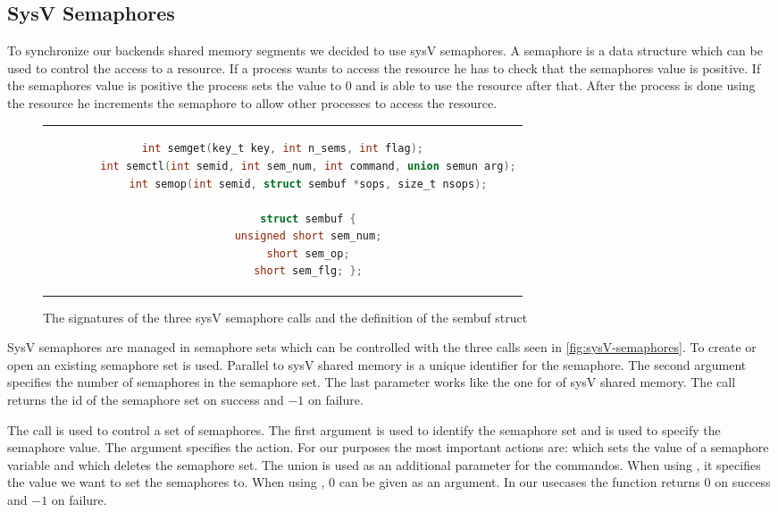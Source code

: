 \subsection{SysV Semaphores}

To synchronize our backends shared memory segments we decided to use sysV semaphores.
A semaphore is a data structure which can be used to control the access to a resource.
If a process wants to access the resource he has to check that the semaphores value is positive.
If the semaphores value is positive the process sets the value to $0$ and is able to use the resource after that.
After the process is done using the resource he increments the semaphore to allow other processes to access the resource.

\begin{figure}[htpb]
	\centering
	\begin{tabular}{c}
		\begin{lstlisting}[language=C]
		int semget(key_t key, int n_sems, int flag);
		int semctl(int semid, int sem_num, int command, union semun arg);
		int semop(int semid, struct sembuf *sops, size_t nsops);
		
		struct sembuf {
		unsigned short sem_num;
		short sem_op;
		short sem_flg; };
		\end{lstlisting}
	\end{tabular}
	\caption[SysV semaphores signatures]{The signatures of the three sysV semaphore calls and the definition of the sembuf struct \cite{unix-programming}}
	\label{fig:sysV-semaphores}
\end{figure}

SysV semaphores are managed in semaphore sets which can be controlled with the three calls seen in \autoref{fig:sysV-semaphores}.
To create or open an existing semaphore set  is used.
Parallel to sysV shared memory  is a unique identifier for the semaphore.
The second argument  specifies the number of semaphores in the semaphore set.
The last parameter  works like the one for  of sysV shared memory.
The call returns the id of the semaphore set on success and $-1$ on failure\cite{unix-programming}.

The  call is used to control a set of semaphores.
The first argument  is used to identify the semaphore set and  is used to specify the semaphore value.
The argument  specifies the action.
For our purposes the most important actions are:  which sets the value of a semaphore variable and  which deletes the semaphore set.
The union  is used as an additional parameter for the commandos.
When using , it specifies the value we want to set the semaphores to.
When using , $0$ can be given as an argument. 
In our usecases the function returns $0$ on success and $-1$ on failure\cite{unix-programming}.

